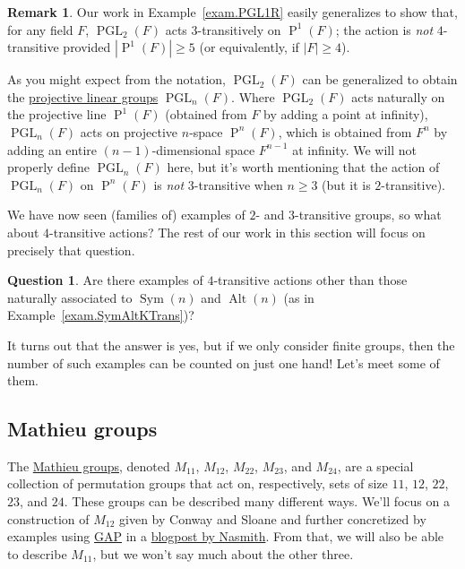 \documentclass[11pt]{amsart}
\theoremstyle{plain}
\theoremstyle{definition}
\newtheorem*{remark*}{Remark}
\newtheorem*{question*}{Question}
\theoremstyle{remark}
\DeclareMathOperator{\Sym}{Sym}
\DeclareMathOperator{\Alt}{Alt}
\DeclareMathOperator{\PGL}{PGL}
\DeclareMathOperator{\Proj}{P}
\begin{document}
\begin{remark*}
Our work in Example~\ref{exam.PGL1R} easily generalizes to show that, for any field $F$,  $\PGL_2(F)$ acts $3$-transitively on $\Proj^1(F)$; the action is \emph{not} $4$-transitive provided $|\Proj^1(F)| \ge 5$ (or equivalently, if $|F| \ge 4$). 
\end{remark*}

As you might expect from the notation, $\PGL_2(F)$ can be generalized to obtain the \href{https://en.wikipedia.org/wiki/Projective_linear_group}{projective linear groups} $\PGL_n(F)$. Where $\PGL_2(F)$ acts naturally on the projective line $\Proj^1(F)$ (obtained from $F$ by adding a point at infinity), $\PGL_n(F)$ acts on projective $n$-space $\Proj^n(F)$, which is obtained from $F^n$ by adding an entire $(n-1)$-dimensional space $F^{n-1}$ at infinity. We will not properly define $\PGL_n(F)$ here, but it's worth mentioning  that the action of $\PGL_n(F)$ on $\Proj^n(F)$ is \emph{not} $3$-transitive when $n\ge 3$ (but it is $2$-transitive).

We have now seen (families of) examples of $2$- and $3$-transitive groups, so what about $4$-transitive actions? The rest of our work in this section will focus on precisely that question. 

\begin{question*}
Are there examples of $4$-transitive actions other than those naturally associated to $\Sym(n)$ and $\Alt(n)$ (as in Example~\ref{exam.SymAltKTrans})? 
\end{question*}

It turns out that the answer is yes, but if we only consider finite groups, then the number of such examples can be counted on just one hand! Let's meet some of them.

\subsection{Mathieu groups}

The \href{https://en.wikipedia.org/wiki/Mathieu_group}{Mathieu groups},  denoted $M_{11}$, $M_{12}$, $M_{22}$, $M_{23}$, and $M_{24}$, are a special collection of  permutation groups that act on, respectively, sets of size $11$, $12$, $22$, $23$, and $24$. These groups can be described many different ways. We'll focus on a construction of $M_{12}$ given by Conway and Sloane \cite{CoSl99} and further concretized by examples using \href{https://www.gap-system.org}{GAP} in a \href{https://www.cantorsparadise.com/the-rubiks-icosahedron-and-the-mathieu-group-m12-444ae64d1ac8}{blogpost by Nasmith}. From that, we will also be able to describe $M_{11}$, but we won't say much about the other three.
\end{document}
